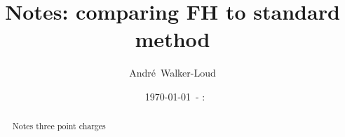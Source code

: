 \documentclass[prd,11pt,tightenlines,preprintnumbers,showpacs,superscriptaddress,notitlepage,nofootinbib,eqsecnum,floatfix,longbibliography]{revtex4-1}
\newcommand{\mydate}{\ \today \ - \number\hour :\number\minute}
\begin{document}
\title{Notes: comparing FH to standard method}




%
%
%
%
%
%
%
%
%
%
%

\author{Andr\'{e}~Walker-Loud}

\date{\mydate}

\begin{abstract}
Notes three point charges
\end{abstract}
\maketitle

\end{document}

